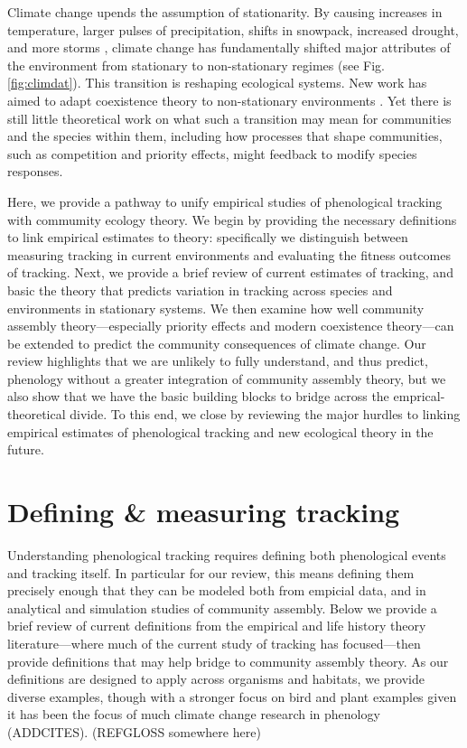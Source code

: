 \documentclass[11pt,letterpaper]{article}
\begin{document}
Climate change upends the assumption of stationarity. By causing increases in temperature, larger pulses of precipitation, shifts in snowpack, increased drought, and more storms \citep{ipcc2013}, climate change has fundamentally shifted major attributes of the environment from stationary to non-stationary regimes (see Fig. \ref{fig:climdat}). This transition is reshaping ecological systems. New work has aimed to adapt coexistence theory to non-stationary environments \citep{chessonnonstat,volkerass}. Yet there is still little theoretical work on what such a transition may mean for communities and the species within them, including how processes that shape communities, such as competition and priority effects, might feedback to modify species responses.

Here, we provide a pathway to unify empirical studies of phenological tracking with commumity ecology theory. We begin by providing the necessary definitions to link empirical estimates to theory: specifically we distinguish between measuring tracking in current environments and evaluating the fitness outcomes of tracking. Next, we provide a brief review of current estimates of tracking, and basic the theory that predicts variation in tracking across species and environments in stationary systems. We then examine how well community assembly theory---especially priority effects and modern coexistence theory---can be extended to predict the community consequences of climate change. Our review highlights that we are unlikely to fully understand, and thus predict, phenology without a greater integration of community assembly theory, but we also show that we have the basic building blocks to bridge across the emprical-theoretical divide. To this end, we close by reviewing the major hurdles to linking empirical estimates of phenological tracking and new ecological theory in the future. %

\section{Defining \& measuring tracking}
Understanding phenological tracking requires defining both phenological events and tracking itself. In particular for our review, this means defining them precisely enough that they can be modeled both from empicial data, and in analytical and simulation studies of community assembly. Below we provide a brief review of current definitions from the empirical and life history theory literature---where much of the current study of tracking has focused---then provide definitions that may help bridge to community assembly theory. As our definitions are designed to apply across organisms and habitats, we provide diverse examples, though with a stronger focus on bird and plant examples given it has been the focus of much climate change research in phenology (ADDCITES). (REFGLOSS somewhere here) 
\end{document}
